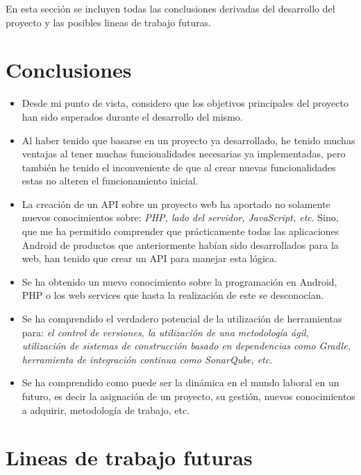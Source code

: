 
En esta sección se incluyen todas las conclusiones derivadas del desarrollo del proyecto y las posibles lineas de trabajo futuras.

\section{Conclusiones}

\begin{itemize}
	\item Desde mi punto de vista, considero que los objetivos principales del proyecto han sido superados durante el desarrollo del mismo.
	
	\item Al haber tenido que basarse en un proyecto ya desarrollado, he tenido muchas ventajas al tener muchas funcionalidades necesarias ya implementadas, pero también he tenido el inconveniente de que al crear nuevas funcionalidades estas no alteren el funcionamiento inicial.
	
	\item La creación de un API sobre un proyecto web ha aportado no solamente nuevos conocimientos sobre: \emph{PHP, lado del servidor, JavaScript, etc}. Sino, que me ha permitido comprender que prácticamente todas las aplicaciones Android de productos que anteriormente habían sido desarrollados para la web, han tenido que crear un API para manejar esta lógica.
	
	\item Se ha obtenido un nuevo conocimiento sobre la programación en Android, PHP o los web services que hasta la realización de este se desconocían.
	
	\item Se ha comprendido el verdadero potencial de la utilización de herramientas para: \emph{el control de versiones, la utilización de una metodología ágil, utilización de sistemas de construcción basado en dependencias como Gradle, herramienta de integración continua como SonarQube, etc}.
	
	\item Se ha comprendido como puede ser la dinámica en el mundo laboral en un futuro, es decir la asignación de un proyecto, su gestión, nuevos conocimientos a adquirir, metodología de trabajo, etc.
\end{itemize}



\section{Lineas de trabajo futuras}

